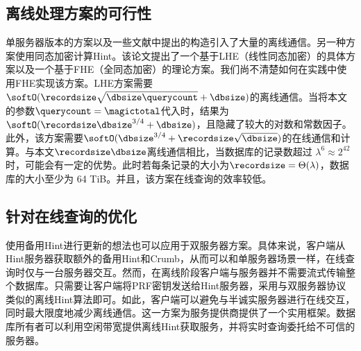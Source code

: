 \subsection{离线处理方案的可行性}
单服务器版本的方案以及一些文献\cite{Piano, EC:CorHenKog22}中提出的构造引入了大量的离线通信。另一种方案\cite{EC:CorHenKog22}使用同态加密计算Hint。该论文提出了一个基于LHE（线性同态加密）的具体方案以及一个基于FHE（全同态加密）的理论方案。我们尚不清楚如何在实践中使用FHE实现该方案。LHE方案需要$\softO(\recordsize\sqrt{\dbsize \querycount} + \dbsize)$的离线通信。当将本文的参数$\querycount=\magictotal$代入时，结果为$\softO(\recordsize\dbsize^{3/4} + \dbsize)$，且隐藏了较大的对数和常数因子。此外，该方案需要$\softO(\dbsize^{3/4}+\recordsize\sqrt{\dbsize})$的在线通信和计算。与本文$\recordsize\dbsize$离线通信相比，当数据库的记录数超过 $\lambda^6 \approx 2^{42}$ 时，可能会有一定的优势。此时若每条记录的大小为$\recordsize = \Theta(\lambda)$，数据库的大小至少为 64 TiB。并且，该方案在线查询的效率较低。

\subsection{针对在线查询的优化}

使用备用Hint进行更新的想法也可以应用于双服务器方案。具体来说，客户端从Hint服务器获取额外的备用Hint和Crumb，从而可以和单服务器场景一样，在线查询时仅与一台服务器交互。然而，在离线阶段客户端与服务器并不需要流式传输整个数据库。只需要让客户端将PRF密钥发送给Hint服务器，采用与双服务器协议类似的离线Hint算法即可。如此，客户端可以避免与半诚实服务器进行在线交互，同时最大限度地减少离线通信。这一方案为服务提供商提供了一个实用框架。数据库所有者可以利用空闲带宽提供离线Hint获取服务，并将实时查询委托给不可信的服务器。